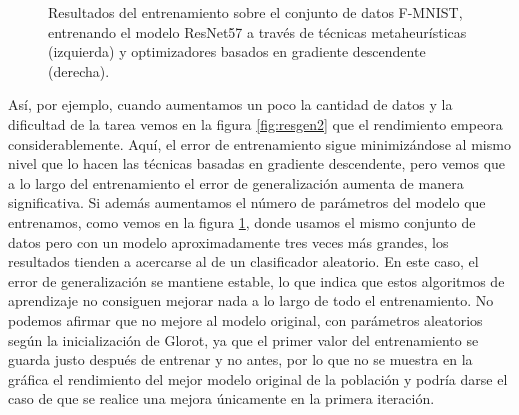 \begin{figure}[!tbp]
\label{fig:resgen3}
  \centering
  \hfill
  \caption{Resultados del entrenamiento sobre el conjunto de datos F-MNIST, entrenando el modelo ResNet57 a través de técnicas metaheurísticas (izquierda) y optimizadores basados en gradiente descendente (derecha).}
\end{figure}


Así, por ejemplo, cuando aumentamos un poco la cantidad de datos y la dificultad de la tarea vemos en la figura \ref{fig:resgen2} que el rendimiento empeora considerablemente. Aquí, el error de entrenamiento sigue minimizándose al mismo nivel que lo hacen las técnicas basadas en gradiente descendente, pero vemos que a lo largo del entrenamiento el error de generalización aumenta de manera significativa. Si además aumentamos el número de parámetros del modelo que entrenamos, como vemos en la figura \ref{fig:resgen3}, donde usamos el mismo conjunto de datos pero con un modelo aproximadamente tres veces más grandes, los resultados tienden a acercarse al de un clasificador aleatorio. En este caso, el error de generalización se mantiene estable, lo que indica que estos algoritmos de aprendizaje no consiguen mejorar nada a lo largo de todo el entrenamiento. No podemos afirmar que no mejore al modelo original, con parámetros aleatorios según la inicialización de Glorot, ya que el primer valor del entrenamiento se guarda justo después de entrenar y no antes, por lo que no se muestra en la gráfica el rendimiento del mejor modelo original de la población y podría darse el caso de que se realice una mejora únicamente en la primera iteración.

